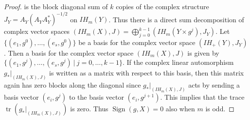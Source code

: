 \documentclass{amsart}
\theoremstyle{definition}
\theoremstyle{remark}
\newcommand {\Sign}    {{\ensuremath{\operatorname{Sign}}}}
\newcommand {\tr}    {{\ensuremath{\operatorname{tr}}}}
\begin{document}
\begin{proof}
is the block diagonal sum of $k$ copies of the complex structure
$J_Y = A_Y (A_Y A_Y^*)^{-1/2}$ on $IH_m (Y)$.
Thus there is a direct sum decomposition of complex vector spaces
$(IH_m (X), J) = \bigoplus_{j=0}^{k-1} (IH_m (Y \times g^j), J_Y).$
Let $\{ (e_1, g^0),\ldots,  (e_s, g^0) \}$ be a basis for the complex
vector space $(IH_+ (Y), J_Y)$.
Then a basis for the complex vector space $(IH_m (X), J)$ is given by
$\{ (e_1, g^j),\ldots,  (e_s, g^j) ~|~ j=0,\ldots, k-1  \}.$
If the complex linear automorphism
$g_*|_{(IH_m (X), J)}$ is written as a matrix with respect to this basis,
then this matrix again has zero blocks along the
diagonal since $g_*|_{(IH_m (X), J)}$ acts by sending a basis vector $(e_i, g^j)$ to 
the basis vector $(e_i, g^{j+1})$.
This implies that the trace $\tr (g_*|_{(IH_m (X), J)})$ is zero.
Thus $\Sign (g,X)=0$ also when $m$ is odd.


\end{proof}
\end{document}

